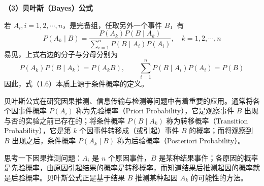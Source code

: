 \documentclass[11pt,openany,UTF8]{ctexbook}
\newcommand{\bhead}[1]{\par\medskip\noindent\textbf{#1}\par\smallskip}
\begin{document}
\bhead{（3\nobreak）贝叶斯（Bayes\nobreak）公式}
若 $A_i,i=1,2,\cdots,n$\nobreak，是完备组\nobreak，任取另外一个事件 $B$\nobreak，有
\begin{equation}
P(A_k\mid B)=\frac{P(A_k)P(B\mid A_k)}{\sum\limits_{i=1}^{n}P(B\mid A_i)P(A_i)},\quad k=1,2,\cdots,n
\label{eq:1.6}
\end{equation}
易见\nobreak，上式右边的分子与分母分别为
\[
P(A_k)P(B\mid A_k)=P(A_kB),\qquad \sum_{i=1}^{n}P(B\mid A_i)P(A_i)=P(B)
\]
因此\nobreak，式（1.6\nobreak）本质上源于条件概率的定义\nobreak。

贝叶斯公式在研究因果推测\nobreak、信息传输与检测等问题中有着重要的应用\nobreak。通常将各个因事件概率 $P(A_i)$ 称为先验概率（Priori Probability\nobreak）\nobreak，它是观察事件 $B$ 出现与否的实验之前已存在的\nobreak；将条件概率 $P(B\mid A_k)$ 称为转移概率（Transition Probability\nobreak）\nobreak，它是第 $k$ 个因事件转移成（或引起\nobreak）事件 $B$ 的概率\nobreak；而将观察到 $B$ 出现之后\nobreak，条件概率 $P(A_k\mid B)$ 称为后验概率（Posteriori Probability\nobreak）\nobreak。

思考一下因果推测问题\nobreak：$A_i$ 是 $n$ 个原因事件\nobreak，$B$ 是某种结果事件\nobreak；各原因的概率是先验概率\nobreak，由原因引起结果的概率是转移概率\nobreak，而知道结果后推测起因的概率就是后验概率\nobreak。贝叶斯公式正是基于结果 $B$ 推测某种起因 $A_k$ 的可能性的方法\nobreak。
\end{document}
